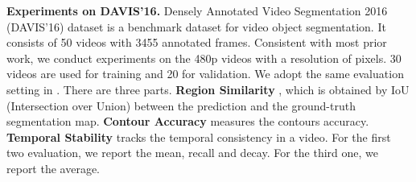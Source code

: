 \documentclass{bmvc2k}
\begin{document}
\textbf{Experiments on DAVIS'16.}
Densely Annotated Video Segmentation 2016 (DAVIS'16) dataset is a benchmark dataset for video object segmentation. It consists of 50 videos with 3455 annotated frames. Consistent with most prior work, we conduct experiments on the 480p videos with a resolution of  pixels. 30 videos are used for training and 20 for validation.
We adopt the same evaluation setting in \cite{Perazzi2016}. There are three parts. \textbf{Region Similarity} , which is obtained by IoU (Intersection over Union) between the prediction and the ground-truth segmentation map. \textbf{Contour Accuracy}  measures the contours accuracy. \textbf{Temporal Stability}  tracks the temporal consistency in a video. For the first two evaluation, we report the mean, recall and decay. For the third one, we report the average.
\end{document}
